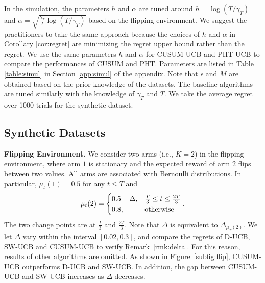 \documentclass[letterpaper]{article}
\newcommand{\green}{}
\begin{document}
{\green
In the simulation, the parameters $h$ and $\alpha$ are tuned around
$h=\log(T/\gamma_T)$ and
$\alpha=\sqrt{\frac{\gamma_T}{T}\log(T/\gamma_T)}$ based on the
flipping environment. We suggest the practitioners to take the same approach because the choices of $h$ and $\alpha$ in Corollary \ref{cor:regret} are minimizing the regret upper bound rather than the regret. We use the same parameters $h$ and $\alpha$ for
CUSUM-UCB and PHT-UCB to compare the performances of CUSUM and
PHT. Parameters are listed in Table \ref{table:simul} in Section \ref{app:simul} of the appendix. Note that $\epsilon$ and $M$ are obtained based on the prior knowledge of the datasets.
The baseline algorithms are tuned similarly with the knowledge of $\gamma_T$ and $T$.
We take the average regret over 1000 trials for the synthetic dataset.%
}


\subsection{Synthetic Datasets}
{\bf Flipping Environment.}
We consider two arms (i.e., $K=2$) in the flipping environment, where arm $1$ is stationary and the expected reward of arm $2$ flips between two values. All arms are associated with Bernoulli distributions. In particular, $\mu_t(1)=0.5$ for any $t\leq T$ and
\begin{eqnarray}\label{eqn:flip}
\mu_t(2)=
\begin{cases}
0.5-\Delta, &\frac{T}{3}\leq t\leq\frac{2T}{3}\cr
0.8, &\text{otherwise}
\end{cases}.
\end{eqnarray}
The two change points are at $\frac{T}{3}$ and $\frac{2T}{3}$. Note that $\Delta$ is equivalent to $\Delta_{\mu_T(2)}$.
We let $\Delta$ vary within the interval $[0.02,0.3]$, and compare the
regrets of D-UCB, SW-UCB and CUSUM-UCB to verify Remark~\ref{rmk:delta}. For this reason, results of other algorithms are omitted.
As shown in Figure~\ref{subfig:flip}, CUSUM-UCB outperforms D-UCB and SW-UCB. In addition, the gap between CUSUM-UCB and SW-UCB increases as $\Delta$ decreases.%
\end{document}
